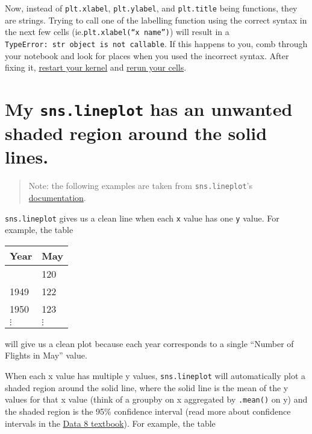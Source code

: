 \documentclass[
  letterpaper,
  DIV=11,
  numbers=noendperiod]{scrreprt}
\begin{document}
Now, instead of \texttt{plt.xlabel}, \texttt{plt.ylabel}, and
\texttt{plt.title} being functions, they are strings. Trying to call one
of the labelling function using the correct syntax in the next few cells
(ie.\texttt{plt.xlabel(“x\ name”)}) will result in a
\texttt{TypeError:\ str\ object\ is\ not\ callable}. If this happens to
you, comb through your notebook and look for places when you used the
incorrect syntax. After fixing it,
\href{https://ds100.org/debugging-guide/jupyter101/jupyter101.html\#restarting-kernel}{restart
your kernel} and
\href{https://ds100.org/debugging-guide/jupyter101/jupyter101.html\#running-cells}{rerun
your cells}.

\section{\texorpdfstring{My \texttt{sns.lineplot} has an unwanted shaded
region around the solid
lines.}{My sns.lineplot has an unwanted shaded region around the solid lines.}}\label{my-sns.lineplot-has-an-unwanted-shaded-region-around-the-solid-lines.}

\begin{quote}
Note: the following examples are taken from \texttt{sns.lineplot}'s
\href{https://seaborn.pydata.org/generated/seaborn.lineplot.html}{documentation}.
\end{quote}

\texttt{sns.lineplot} gives us a clean line when each \texttt{x} value
has one \texttt{y} value. For example, the table

\begin{longtable}[]{@{}ll@{}}
\toprule\noalign{}
Year & May \\
\midrule\noalign{}
\endhead
\bottomrule\noalign{}
\endlastfoot
1948 & 120 \\
1949 & 122 \\
1950 & 123 \\
\(\vdots\) & \(\vdots\) \\
\end{longtable}

will give us a clean plot because each year corresponds to a single
``Number of Flights in May'' value.

When each x value has multiple y values, \texttt{sns.lineplot} will
automatically plot a shaded region around the solid line, where the
solid line is the mean of the y values for that x value (think of a
groupby on x aggregated by \texttt{.mean()} on y) and the shaded region
is the 95\% confidence interval (read more about confidence intervals in
the
\href{https://inferentialthinking.com/chapters/13/3/Confidence_Intervals.html?highlight=confidence+intervals}{Data
8 textbook}). For example, the table
\end{document}
